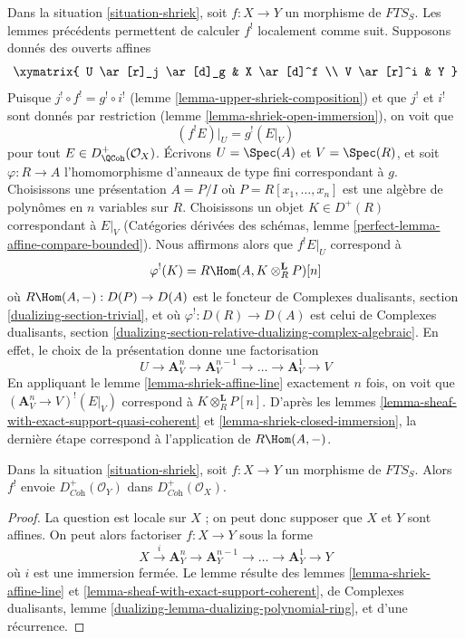 \begin{remark}
\label{remark-local-calculation-shriek}
Dans la situation \ref{situation-shriek}, soit $f : X \to Y$ un morphisme de $\textit{FTS}_S$. Les lemmes précédents permettent de calculer $f^!$ localement comme suit. Supposons donnés des ouverts affines
$$
\xymatrix{
U \ar[r]_j \ar[d]_g & X \ar[d]^f \\
V \ar[r]^i & Y
}
$$
Puisque $j^! \circ f^! = g^! \circ i^!$ (lemme \ref{lemma-upper-shriek-composition}) et que $j^!$ et $i^!$ sont donnés par restriction (lemme \ref{lemma-shriek-open-immersion}), on voit que
$$
(f^!E)|_U = g^!(E|_V)
$$
pour tout $E \in D^+_\QCoh(\mathcal{O}_X)$. Écrivons $U = \Spec(A)$ et $V = \Spec(R)$, et soit $\varphi : R \to A$ l'homomorphisme d'anneaux de type fini correspondant à $g$. Choisissons une présentation $A = P/I$ où $P = R[x_1, \ldots, x_n]$ est une algèbre de polynômes en $n$ variables sur $R$. Choisissons un objet $K \in D^+(R)$ correspondant à $E|_V$ (Catégories dérivées des schémas, lemme \ref{perfect-lemma-affine-compare-bounded}). Nous affirmons alors que $f^!E|_U$ correspond à
$$
\varphi^!(K) = R\Hom(A, K \otimes_R^\mathbf{L} P)[n]
$$
où $R\Hom(A, -) : D(P) \to D(A)$ est le foncteur de Complexes dualisants, section \ref{dualizing-section-trivial}, et où $\varphi^! : D(R) \to D(A)$ est celui de Complexes dualisants, section \ref{dualizing-section-relative-dualizing-complex-algebraic}. En effet, le choix de la présentation donne une factorisation
$$
U \rightarrow \mathbf{A}^n_V \to \mathbf{A}^{n - 1}_V \to \ldots \to
\mathbf{A}^1_V \to V
$$
En appliquant le lemme \ref{lemma-shriek-affine-line} exactement $n$ fois, on voit que $(\mathbf{A}^n_V \to V)^!(E|_V)$ correspond à $K \otimes_R^\mathbf{L} P[n]$. D'après les lemmes \ref{lemma-sheaf-with-exact-support-quasi-coherent} et \ref{lemma-shriek-closed-immersion}, la dernière étape correspond à l'application de $R\Hom(A, -)$.
\end{remark}

\begin{lemma}
\label{lemma-shriek-coherent}
Dans la situation \ref{situation-shriek}, soit $f : X \to Y$ un morphisme de $\textit{FTS}_S$. Alors $f^!$ envoie $D_{\textit{Coh}}^+(\mathcal{O}_Y)$ dans $D_{\textit{Coh}}^+(\mathcal{O}_X)$.
\end{lemma}

\begin{proof}
La question est locale sur $X$ ; on peut donc supposer que $X$ et $Y$ sont affines. On peut alors factoriser $f : X \to Y$ sous la forme
$$
X \xrightarrow{i} \mathbf{A}^n_Y \to \mathbf{A}^{n - 1}_Y \to \ldots \to
\mathbf{A}^1_Y \to Y
$$
où $i$ est une immersion fermée. Le lemme résulte des lemmes \ref{lemma-shriek-affine-line} et \ref{lemma-sheaf-with-exact-support-coherent}, de Complexes dualisants, lemme \ref{dualizing-lemma-dualizing-polynomial-ring}, et d'une récurrence.
\end{proof}


